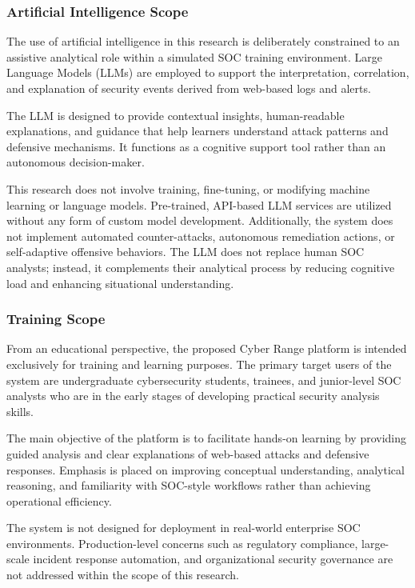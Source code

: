 \subsubsection{Artificial Intelligence Scope}
The use of artificial intelligence in this research is deliberately constrained to an assistive analytical role within a simulated SOC training environment. Large Language Models (LLMs) are employed to support the interpretation, correlation, and explanation of security events derived from web-based logs and alerts.

The LLM is designed to provide contextual insights, human-readable explanations, and guidance that help learners understand attack patterns and defensive mechanisms. It functions as a cognitive support tool rather than an autonomous decision-maker.

This research does not involve training, fine-tuning, or modifying machine learning or language models. Pre-trained, API-based LLM services are utilized without any form of custom model development. Additionally, the system does not implement automated counter-attacks, autonomous remediation actions, or self-adaptive offensive behaviors. The LLM does not replace human SOC analysts; instead, it complements their analytical process by reducing cognitive load and enhancing situational understanding.

\subsubsection{Training Scope}
From an educational perspective, the proposed Cyber Range platform is intended exclusively for training and learning purposes. The primary target users of the system are undergraduate cybersecurity students, trainees, and junior-level SOC analysts who are in the early stages of developing practical security analysis skills.

The main objective of the platform is to facilitate hands-on learning by providing guided analysis and clear explanations of web-based attacks and defensive responses. Emphasis is placed on improving conceptual understanding, analytical reasoning, and familiarity with SOC-style workflows rather than achieving operational efficiency.

The system is not designed for deployment in real-world enterprise SOC environments. Production-level concerns such as regulatory compliance, large-scale incident response automation, and organizational security governance are not addressed within the scope of this research.

